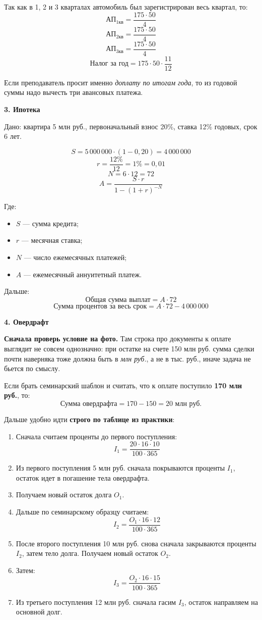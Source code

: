 \documentclass[12pt,a4paper]{article}
\begin{document}
Так как в 1, 2 и 3 кварталах автомобиль был зарегистрирован весь квартал, то:
\[
\text{АП}_{1\text{кв}}=\frac{175 \cdot 50}{4}
\]
\[
\text{АП}_{2\text{кв}}=\frac{175 \cdot 50}{4}
\]
\[
\text{АП}_{3\text{кв}}=\frac{175 \cdot 50}{4}
\]
\[
\text{Налог за год}=175 \cdot 50 \cdot \frac{11}{12}
\]

Если преподаватель просит именно \textit{доплату по итогам года}, то из годовой суммы надо вычесть три авансовых платежа.

\textbf{3. Ипотека}

Дано: квартира 5 млн руб., первоначальный взнос 20\%, ставка 12\% годовых, срок 6 лет.

\[
S = 5\,000\,000 \cdot (1-0{,}20)=4\,000\,000
\]
\[
r=\frac{12\%}{12}=1\%=0{,}01
\]
\[
N=6 \cdot 12=72
\]
\[
A=\frac{S \cdot r}{1-(1+r)^{-N}}
\]

Где:
\begin{itemize}
\item $S$ --- сумма кредита;
\item $r$ --- месячная ставка;
\item $N$ --- число ежемесячных платежей;
\item $A$ --- ежемесячный аннуитетный платеж.
\end{itemize}

Дальше:
\[
\text{Общая сумма выплат}=A \cdot 72
\]
\[
\text{Сумма процентов за весь срок}=A \cdot 72 - 4\,000\,000
\]

\textbf{4. Овердрафт}

\textbf{Сначала проверь условие на фото.} Там строка про документы к оплате выглядит не совсем однозначно: при остатке на счете 150 млн руб. сумма сделки почти наверняка тоже должна быть в \textit{млн руб.}, а не в тыс. руб., иначе задача не бьется по смыслу.

Если брать семинарский шаблон и считать, что к оплате поступило \textbf{170 млн руб.}, то:
\[
\text{Сумма овердрафта}=170-150=20 \text{ млн руб.}
\]

Дальше удобно идти \textbf{строго по таблице из практики}:
\begin{enumerate}
\item Сначала считаем проценты до первого поступления:
\[
I_1=\frac{20 \cdot 16 \cdot 10}{100 \cdot 365}
\]
\item Из первого поступления 5 млн руб. сначала покрываются проценты $I_1$, остаток идет в погашение тела овердрафта.
\item Получаем новый остаток долга $O_1$.
\item Дальше по семинарскому образцу считаем:
\[
I_2=\frac{O_1 \cdot 16 \cdot 12}{100 \cdot 365}
\]
\item После второго поступления 10 млн руб. снова сначала закрываются проценты $I_2$, затем тело долга. Получаем новый остаток $O_2$.
\item Затем:
\[
I_3=\frac{O_2 \cdot 16 \cdot 15}{100 \cdot 365}
\]
\item Из третьего поступления 12 млн руб. сначала гасим $I_3$, остаток направляем на основной долг.
\end{enumerate}
\end{document}
